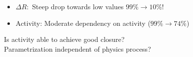 \documentclass{beamer}
\begin{document}
\begin{frame}
\begin{columns}
\begin{column}{0.5\textwidth}
  \end{column}
 \end{columns}
 \begin{itemize}
  \item $\Delta R:$ Steep drop towards low values $99\%\rightarrow 10\%$!
  \item Activity: Moderate dependency on activity ($99\%\rightarrow 74\%$)
 \end{itemize}
  \begin{block}{}
 \centering
 Is activity able to achieve good closure?\\ Parametrization independent of physics process?
 \end{block}
\end{frame}
\end{document}
